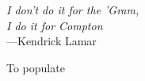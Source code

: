 \begin{frontmatter}
\begin{epigraph}
\vspace{10pt}

  \emph{I don't do it for the 'Gram,\\
	 I do it for Compton}\\
  ---Kendrick Lamar \\ 



\end{epigraph}

%


%
\tableofcontents
\listoffigures  %
\listoftables   %



%
%
\begin{acknowledgements}



To populate

\vspace{0.25in}


\end{acknowledgements}
\end{frontmatter}
